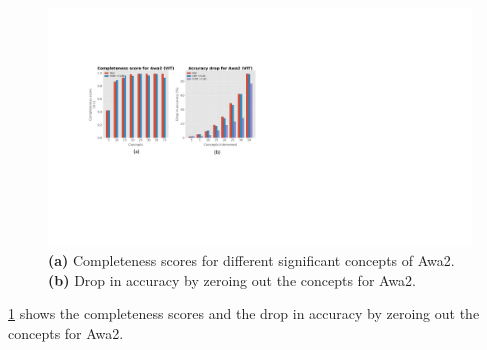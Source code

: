 \begin{figure}
\centering
\includegraphics[width=\columnwidth]
{figures/Supp/Awa2.pdf}
\vskip -7pt
\caption{\textbf{(a)} Completeness scores for different significant concepts of Awa2.  \textbf{(b)} Drop in accuracy by zeroing out the concepts for Awa2.}
\vskip -10pt
\label{fig:completeness_acc_awa2}
\end{figure}

\cref{fig:completeness_acc_awa2} shows the completeness scores and the drop in accuracy by zeroing out the concepts for Awa2.